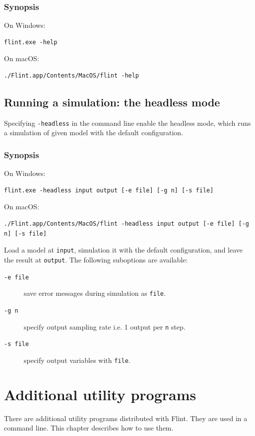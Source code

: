 \documentclass[a4paper,10pt]{report}
\begin{document}
\subsection{Synopsis}
\label{sec:orgbd11071}
On Windows:
\begin{verbatim}
flint.exe -help
\end{verbatim}
On macOS:
\begin{verbatim}
./Flint.app/Contents/MacOS/flint -help
\end{verbatim}

\section{Running a simulation: the headless mode}
\label{sec:org8ddb2a9}
Specifying \texttt{-headless} in the command line enable the headless mode, which
runs a simulation of given model with the default configuration.

\subsection{Synopsis}
\label{sec:orgc3bbc89}
On Windows:
\begin{verbatim}
flint.exe -headless input output [-e file] [-g n] [-s file]
\end{verbatim}
On macOS:
\begin{verbatim}
./Flint.app/Contents/MacOS/flint -headless input output [-e file] [-g n] [-s file]
\end{verbatim}
Load a model at \texttt{input}, simulation it with the default configuration,
and leave the result at \texttt{output}.
The following suboptions are available:

\begin{description}
\item[{\texttt{-e file}}] save error messages during simulation as \texttt{file}.
\item[{\texttt{-g n}}] specify output sampling rate i.e. 1 output per \texttt{n} step.
\item[{\texttt{-s file}}] specify output variables with \texttt{file}.
\end{description}

\chapter{Additional utility programs}
\label{sec:org221625c}
There are additional utility programs distributed with Flint.
They are used in a command line.
This chapter describes how to use them.
\end{document}
